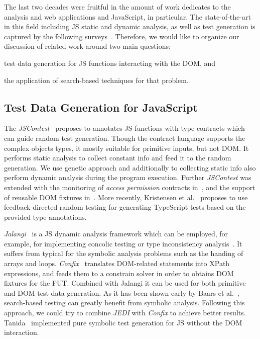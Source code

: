 \documentclass[sigconf,review,anonymous]{acmart}
\begin{document}
The last two decades were fruitful in the amount of work dedicates to the analysis and web applications and JavaScript, in particular. The state-of-the-art in this field including JS static and dynamic analysis, as well as test generation is captured by the following surveys~\cite{andreasen2017survey, sun2017analysis, mesbah2015advances}. Therefore, we would like to organize our discussion of related work around two main questions: 
\begin{enumerate*}
\item test data generation for JS functions interacting with the DOM, and
\item the application of search-based techniques for that problem.
\end{enumerate*}  

\subsection{Test Data Generation for JavaScript}

The \emph{JSContest}~\cite{heidegger2010contract} proposes to annotates JS functions with type-contracts which can guide random test generation. Though the contract language supports the complex objects types, it mostly suitable for primitive inputs, but not DOM. It performs static analysis to collect constant info and feed it to the random generation. We use genetic approach and additionally to collecting static info also perform dynamic analysis during the program execution. Further \emph{JSContest} was extended with the monitoring of \emph{access permission} contracts in~\cite{heidegger2012jscontest}, and the support of reusable DOM fixtures in~\cite{heidegger2010dom}. More recently, Kristensen et al.~\cite{kristensen2017type} proposes to use feedback-directed random testing for generating TypeScript tests based on the provided type annotations. 

\emph{Jalangi}~\cite{sen2013jalangi} is a JS dynamic analysis framework which can be employed, for example, for implementing concolic testing or type inconsistency analysis~\cite{pradel2015typedevil}. It suffers from typical for the symbolic analysis problems such as the handing of arrays and loops. \emph{Confix}~\cite{amin:ase15} translates DOM-related statements into XPath expressions, and feeds them to a constrain solver in order to obtains DOM fixtures for the FUT. Combined with Jalangi it can be used for both primitive and DOM test data generation. As it has been shown early by Baars et al.~\cite{baars2011symbolic}, search-based testing can greatly benefit from symbolic analysis. Following this approach, we could try to combine \emph{JEDI} with \emph{Confix} to achieve better results. Tanida~\cite{tanida2014automatic} implemented pure symbolic test generation for JS without the DOM interaction.
\end{document}
